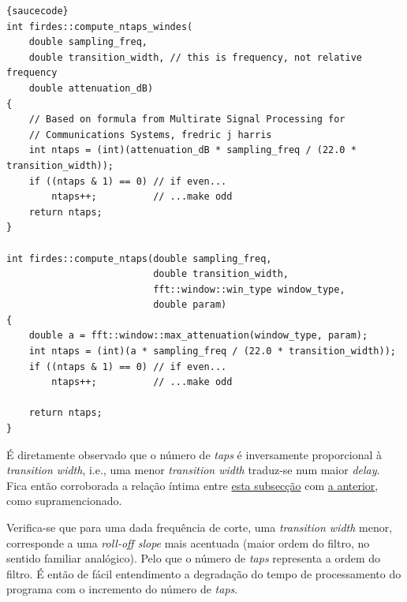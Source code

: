\begin{lstlisting}[caption=\textit{Source code}: \color{white}{\underline{https://github.com/gnuradio/gnuradio/blob/master/gr-filter/lib/firdes.cc}}, frame=tlrb]{saucecode}
int firdes::compute_ntaps_windes(
    double sampling_freq,
    double transition_width, // this is frequency, not relative frequency
    double attenuation_dB)
{
    // Based on formula from Multirate Signal Processing for
    // Communications Systems, fredric j harris
    int ntaps = (int)(attenuation_dB * sampling_freq / (22.0 * transition_width));
    if ((ntaps & 1) == 0) // if even...
        ntaps++;          // ...make odd
    return ntaps;
}

int firdes::compute_ntaps(double sampling_freq,
                          double transition_width,
                          fft::window::win_type window_type,
                          double param)
{
    double a = fft::window::max_attenuation(window_type, param);
    int ntaps = (int)(a * sampling_freq / (22.0 * transition_width));
    if ((ntaps & 1) == 0) // if even...
        ntaps++;          // ...make odd

    return ntaps;
}
\end{lstlisting}

É diretamente observado que o número de \textit{taps} é inversamente proporcional à \textit{transition width}, i.e., uma menor \textit{transition width} traduz-se num maior \textit{delay}. Fica então corroborada a relação íntima entre \hyperref[subsec:delay]{esta subsecção} com \hyperref[subsec:transition-width]{a anterior}, como supramencionado. 

Verifica-se que para uma dada frequência de corte, uma \textit{transition width} menor, corresponde a uma \textit{roll-off slope} mais acentuada (maior ordem do filtro, no sentido familiar analógico). Pelo que o número de \textit{taps} representa a ordem do filtro. É então de fácil entendimento a degradação do tempo de processamento do programa com o incremento do número de \textit{taps}.

